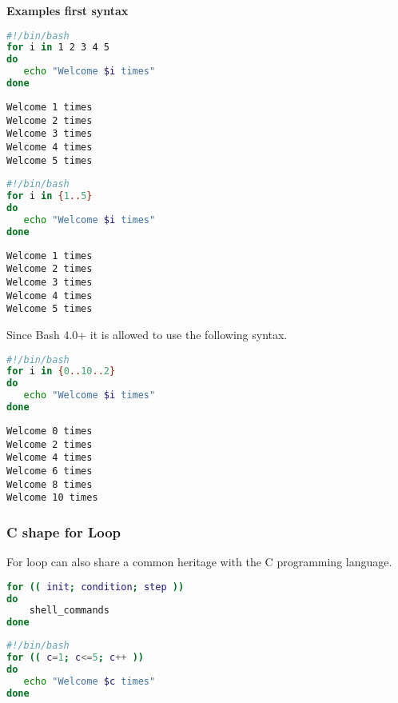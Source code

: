 \documentclass{article}
\begin{document}
\begin{center}
	\textbf{Examples first syntax}
\end{center}
\begin{paracol}{2}

	\begin{lstlisting}[style=command, language=bash]
#!/bin/bash
for i in 1 2 3 4 5
do
   echo "Welcome $i times"
done
\end{lstlisting}

	\switchcolumn

	\begin{lstlisting}[style=terminal]
Welcome 1 times
Welcome 2 times
Welcome 3 times
Welcome 4 times
Welcome 5 times
\end{lstlisting}

	\switchcolumn

	\begin{lstlisting}[style=command, language=bash]
#!/bin/bash
for i in {1..5}
do
   echo "Welcome $i times"
done
\end{lstlisting}

	\switchcolumn

	\begin{lstlisting}[style=terminal]
Welcome 1 times
Welcome 2 times
Welcome 3 times
Welcome 4 times
Welcome 5 times
\end{lstlisting}

\end{paracol}

\raggedright Since Bash 4.0+ it is allowed to use the following syntax.\\

\begin{paracol}{2}

	\begin{lstlisting}[style=command, language=bash]
#!/bin/bash
for i in {0..10..2}
do
   echo "Welcome $i times"
done
    \end{lstlisting}
	\switchcolumn

	\begin{lstlisting}[style=terminal]
Welcome 0 times
Welcome 2 times
Welcome 4 times
Welcome 6 times
Welcome 8 times
Welcome 10 times
\end{lstlisting}

\end{paracol}

\subsubsection{C shape for Loop}
For loop can also share a common heritage with the C programming language.
\begin{paracol}{2}
	\begin{lstlisting}[style=command, language=bash]
for (( init; condition; step ))
do
    shell_commands
done
\end{lstlisting}
	\switchcolumn

	\begin{lstlisting}[style=command, language=bash]
#!/bin/bash
for (( c=1; c<=5; c++ ))
do
   echo "Welcome $c times"
done
\end{lstlisting}

\end{paracol}
\end{document}
